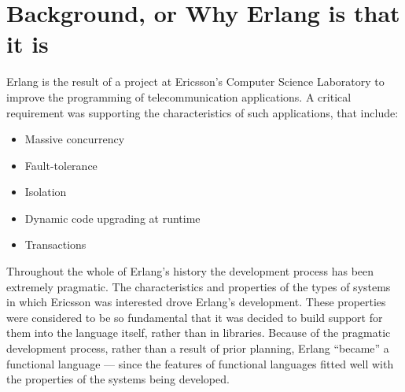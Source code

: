 \chapter{Background, or Why Erlang is that it is}
\label{background}

Erlang is the result of a project at Ericsson's Computer Science Laboratory to
improve the programming of telecommunication applications.  A critical
requirement was supporting the characteristics of such applications, that include:

\begin{itemize}
\item Massive concurrency

\item Fault-tolerance

\item Isolation

\item Dynamic code upgrading at runtime

\item Transactions
\end{itemize}

Throughout the whole of Erlang's history the development process has
been extremely pragmatic. The characteristics and properties of the
types of systems in which Ericsson was interested drove Erlang's
development.  These properties were considered to be so
fundamental that it was decided to build support for them into the
language itself, rather than in libraries.  Because of the pragmatic development
process, rather than a result of prior planning, Erlang ``became'' a functional language --- since
the features of functional languages fitted well with the properties of the systems being developed.

